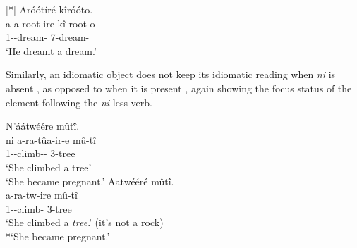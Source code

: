 \documentclass[output=paper]{langscibook}
\begin{document}
\ea
\label{bkm:Ref125199609}

\ex
[*]{
\label{bkm:Ref94518433}
Aróótíré kîróóto.\\
\gll
a-a-root-ire  kî-root-o\\
1\SM-\PST{}-dream-\PFV{} 7-dream-\NMLZ{}\\
\glt
‘He dreamt a dream.’
}


\z
\z

Similarly, an idiomatic object does not keep its idiomatic reading when \textit{ni} is absent , as opposed to when it is present , again showing the focus status of the element following the \textit{ni}-less verb.

\ea
\label{bkm:Ref125199820}
\ea
\label{bkm:Ref125199820:a}
N’áátwéére mûtî́.\\
\gll
ni  a-ra-tûa-ir-e  mû-tî\\
\FOC{}  1\SM-\YPST{}-climb-\PFV-\FV{} 3-tree\\
\glt
‘She climbed a tree’\\
‘She became pregnant.’
\pagebreak
\ex
\label{bkm:Ref125199820:b}
Aatwééré mût\'{î}.\\
\gll
a-ra-tw-ire  mû-tî\\
1\SM-\YPST{}-climb-\PFV{} 3-tree\\
\glt
‘She climbed a \textit{tree}.’ (it’s not a rock)\\
*`She became pregnant.’
\end{document}
